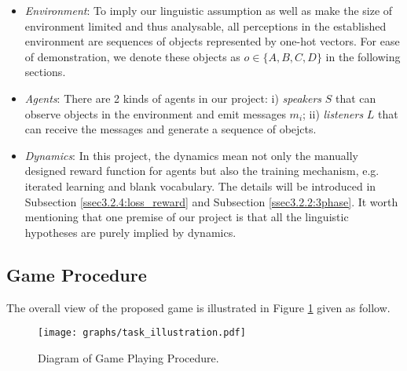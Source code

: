 \documentclass[msc,deptreport]{infthesis} %
\begin{document}
\begin{itemize}
  \item \textit{Environment}: To imply our linguistic assumption as well as make the size of environment limited and thus analysable, all perceptions in the established environment are sequences of objects represented by one-hot vectors. For ease of demonstration, we denote these objects as $o \in \{ A, B, C, D\}$ in the following sections.
  \item \textit{Agents}: There are 2 kinds of agents in our project: i) \textit{speakers} $S$ that can observe objects in the environment and emit messages $m_i$; ii) \textit{listeners} $L$ that can receive the messages and generate a sequence of obejcts.
  \item \textit{Dynamics}: In this project, the dynamics mean not only the manually designed reward function for agents but also the training mechanism, e.g. iterated learning and blank vocabulary. The details will be introduced in Subsection \ref{ssec3.2.4:loss_reward} and Subsection \ref{ssec3.2.2:3phase}. It worth mentioning that one premise of our project is that all the linguistic hypotheses are purely implied by dynamics.
\end{itemize}

\subsection{Game Procedure}
\label{ssec3.1.1:game_procedure}

The overall view of the proposed game is illustrated in Figure \ref{fig2:game_procedure} given as follow.

\begin{figure}[!h]
  \centering
  \texttt{[image: graphs/task\_illustration.pdf]}
  \caption{Diagram of Game Playing Procedure.}
  \label{fig2:game_procedure}
\end{figure}
\end{document}
